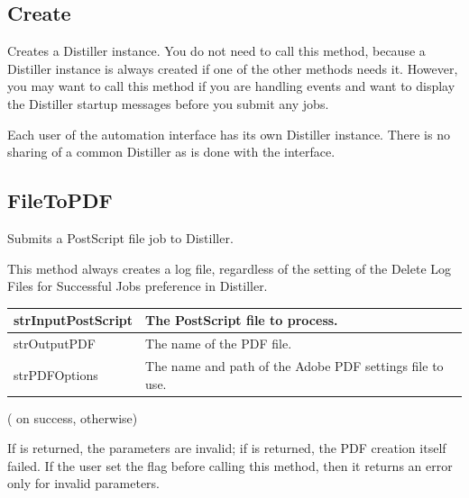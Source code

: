 \documentclass[letterpaper,12pt,english,openany,oneside]{sphinxmanual}
\begin{document}
\subsection{Create}
\label{\detokenize{Distiller_AutomationIntro:create}}
Creates a Distiller instance. You do not need to call this method, because a Distiller instance is always created if one of the other methods needs it. However, you may want to call this method if you are handling events and want to display the Distiller startup messages before you submit any jobs.

Each user of the automation interface has its own Distiller instance. There is no sharing of a common Distiller as is done with the  interface.




\subsection{FileToPDF}
\label{\detokenize{Distiller_AutomationIntro:filetopdf}}
Submits a PostScript file job to Distiller.

This method always creates a log file, regardless of the setting of the Delete Log Files for Successful Jobs preference in Distiller.



\begin{savenotes}\sphinxattablestart
\centering
\begin{tabulary}{\linewidth}[t]{|T|T|}
\hline

strInputPostScript
&
The PostScript file to process.
\\
\hline
strOutputPDF
&
The name of the PDF file.
\\
\hline
strPDFOptions
&
The name and path of the Adobe PDF settings file to use.
\\
\hline
\end{tabulary}
\par
\sphinxattableend\end{savenotes}


 ( on success,  otherwise)

If  is returned, the parameters are invalid; if  is returned, the PDF creation itself failed. If the user set the  flag before calling this method, then it returns an error only for invalid parameters.
\end{document}
